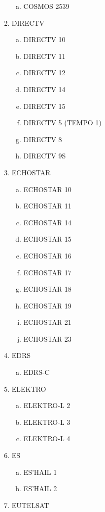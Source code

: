 \begin{multicols}{2}
\begin{enumerate}
\begin{enumerate}[a.]
    \item COSMOS 2539
  \end{enumerate}
  \item DIRECTV
  \begin{enumerate}[a.]
    \item DIRECTV 10
    \item DIRECTV 11
    \item DIRECTV 12
    \item DIRECTV 14
    \item DIRECTV 15
    \item DIRECTV 5 (TEMPO 1)
    \item DIRECTV 8
    \item DIRECTV 9S
  \end{enumerate}
  \item ECHOSTAR
  \begin{enumerate}[a.]
    \item ECHOSTAR 10
    \item ECHOSTAR 11
    \item ECHOSTAR 14
    \item ECHOSTAR 15
    \item ECHOSTAR 16
    \item ECHOSTAR 17
    \item ECHOSTAR 18
    \item ECHOSTAR 19
    \item ECHOSTAR 21
    \item ECHOSTAR 23
  \end{enumerate}
  \item EDRS
  \begin{enumerate}[a.]
    \item EDRS-C
  \end{enumerate}
  \item ELEKTRO
  \begin{enumerate}[a.]
    \item ELEKTRO-L 2
    \item ELEKTRO-L 3
    \item ELEKTRO-L 4
  \end{enumerate}
  \item ES
  \begin{enumerate}[a.]
    \item ES'HAIL 1
    \item ES'HAIL 2
  \end{enumerate}
  \item EUTELSAT
  \begin{enumerate}[a.]

\end{enumerate}
\end{enumerate}
\end{multicols}
